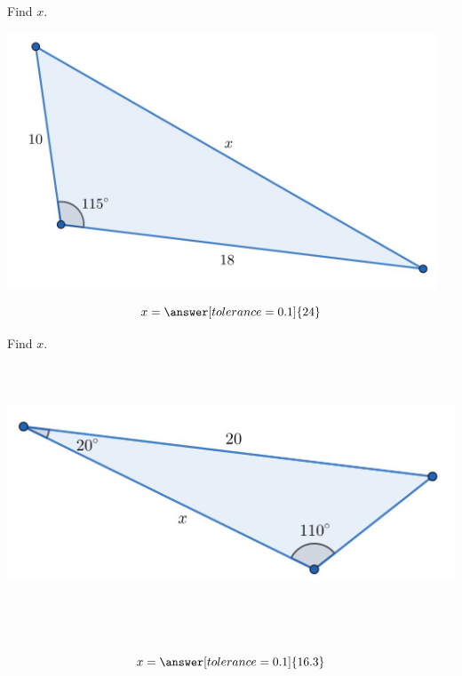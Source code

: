 \documentclass{ximera}
\begin{document}
\begin{problem}\label{prob:160hom12prob2}
Find $x$.
\begin{image}
   
\includegraphics[height=3in]{160H12pic3.jpg}~
 
\end{image}
$$x=\answer[tolerance=0.1]{24}$$
\end{problem}

\begin{problem}\label{prob:160hom12prob3}
Find $x$.
\begin{image}
   
\includegraphics[height=3in]{160H12pic2.jpg}~
 
\end{image}
$$x=\answer[tolerance=0.1]{16.3}$$
\end{problem}
\end{document}
